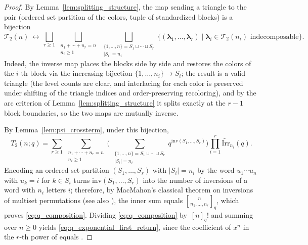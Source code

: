 \documentclass[10pt,a4paper]{amsart}
\numberwithin{equation}{section}
\newcommand{\ssp}{\hspace{1pt}}
\theoremstyle{definition}
\begin{document}
\begin{proof}
	By Lemma~\ref{lem:splitting_structure}, the map sending a triangle to the
	pair (ordered set partition of the colors, tuple of standardized
	blocks) is a bijection
	\begin{equation*}
		\mathcal{T}_2(n)\,\longleftrightarrow\,
		\bigsqcup_{r\ge1}\,
		\bigsqcup_{\substack{n_1+\cdots+n_r=n\\ n_i\ge1}}\,
		\bigsqcup_{\substack{\{1,\dots,n\}=S_1\sqcup\cdots\sqcup S_r\\
		|S_i|=n_i}}
		\bigl\{(\boldsymbol\lambda_1,\dots,\boldsymbol\lambda_r)\mid
		\boldsymbol\lambda_i\in\mathcal{T}_2(n_i)
		\text{ indecomposable}\bigr\}.
	\end{equation*}
	Indeed, the inverse map places the blocks side by side and restores
	the colors of the $i$-th block via the increasing bijection
	$\{1,\dots,n_i\}\to S_i$; the result is a valid triangle (the level
	counts are clear, and interlacing for each color is preserved under
	shifting of the triangle indices and order-preserving recoloring),
	and by the arc criterion of Lemma~\ref{lem:splitting_structure} it splits
	exactly at the $r-1$ block boundaries, so the two maps are mutually
	inverse.

	By Lemma~\ref{lem:psi_crossterm}, under this bijection,
	\begin{equation*}
		T_2(n;q)
		=\sum_{r\ge1}\, \sum_{\substack{n_1+\cdots+n_r=n\\ n_i\ge1}}
		\Biggl(\ \sum_{\substack{\{1,\dots,n\}=S_1\sqcup\cdots\sqcup
		S_r\\ |S_i|=n_i}}
		q^{\mathrm{inv}(S_1,\dots,S_r)}\Biggr)
		\prod_{i=1}^{r}\widetilde{\mathrm{Irr}}_{n_i}(q).
	\end{equation*}
	Encoding an ordered set partition $(S_1,\dots,S_r)$ with $|S_i|=n_i$
	by the word $u_1\cdots u_n$ with $u_k=i$ for $k\in S_i$ turns
	$\mathrm{inv}(S_1,\dots,S_r)$ into the number of inversions of a
	word with $n_i$ letters $i$; therefore, by MacMahon's classical
	theorem on inversions of multiset permutations \cite{MacMahonBook}
	(see also \cite[Section~1.3]{Stanley1997}), the inner sum equals
 ${n\brack n_1,\dots,n_r}_q$, which proves \eqref{eq:q_composition}.
	Dividing \eqref{eq:q_composition} by~$[n]_q!$ and summing over
	$n\ge0$ yields \eqref{eq:q_exponential_first_return}, since the
	coefficient of $x^n$ in the $r$-th power of
	\smash{$\sum_{j\ge1}\widetilde{\mathrm{Irr}}_j(q)\ssp x^j/[j]_q!$} equals
	.
\end{proof}
\end{document}
